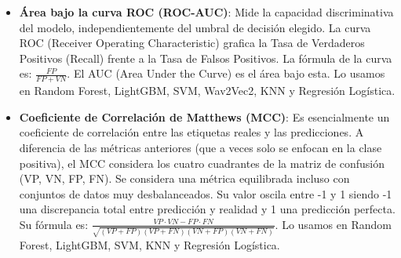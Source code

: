 \begin{itemize}
	\item \textbf{Área bajo la curva ROC (ROC-AUC)}: Mide la capacidad discriminativa del modelo, independientemente del umbral de decisión elegido. La curva ROC (Receiver Operating Characteristic) grafica la Tasa de Verdaderos Positivos (Recall) frente a la Tasa de Falsos Positivos. La fórmula de la curva es: $\frac{FP}{FP + VN}$. El AUC (Area Under the Curve) es el área bajo esta. Lo usamos en Random Forest, LightGBM, SVM, Wav2Vec2, KNN y Regresión Logística.
	
	\item \textbf{Coeficiente de Correlación de Matthews (MCC)}: Es esencialmente un coeficiente de correlación entre las etiquetas reales y las predicciones. A diferencia de las métricas anteriores (que a veces solo se enfocan en la clase positiva), el MCC considera los cuatro cuadrantes de la matriz de confusión (VP, VN, FP, FN). Se considera una métrica equilibrada incluso con conjuntos de datos muy desbalanceados. Su valor oscila entre -1 y 1 siendo -1 una discrepancia total entre predicción y realidad y 1 una predicción perfecta. Su fórmula es: $\frac{VP \cdot VN - FP \cdot FN}{\sqrt{(VP+FP)(VP+FN)(VN+FP)(VN+FN)}}$. Lo usamos en Random Forest, LightGBM, SVM, KNN y Regresión Logística.
\end{itemize}

